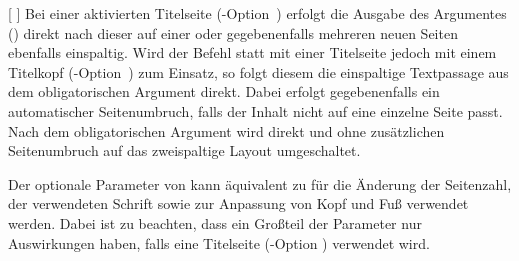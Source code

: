 \begin{Declaration*}{}
\begin{Declaration*}{}
\begin{Declaration*}{}
\begin{Declaration}{%
  [%
  ]%
}
Bei einer aktivierten Titelseite (\KOMAScript-Option~) 
erfolgt die Ausgabe des Argumentes () direkt nach dieser 
auf einer oder gegebenenfalls mehreren neuen Seiten ebenfalls einspaltig. Wird 
der Befehl  statt mit einer Titelseite jedoch mit 
einem Titelkopf (\KOMAScript-Option~) zum Einsatz, so 
folgt diesem die einspaltige Textpassage aus dem obligatorischen Argument 
direkt. Dabei erfolgt gegebenenfalls ein automatischer Seitenumbruch, falls der 
Inhalt nicht auf eine einzelne Seite passt. Nach dem obligatorischen Argument 
 wird direkt und ohne zusätzlichen Seitenumbruch auf das 
zweispaltige Layout umgeschaltet.

Der optionale Parameter von  kann äquivalent zu 
 für die Änderung der Seitenzahl, der verwendeten Schrift 
sowie zur Anpassung von Kopf und Fuß verwendet werden. Dabei ist zu beachten, 
dass ein Großteil der Parameter nur Auswirkungen haben, falls eine Titelseite
(\KOMAScript-Option ) verwendet wird.
\end{Declaration}


\end{Declaration*}
\end{Declaration*}
\end{Declaration*}
